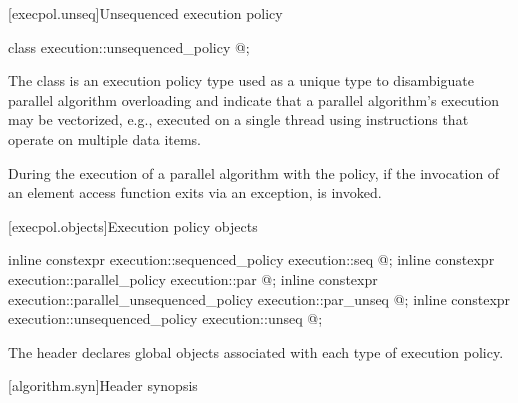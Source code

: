 [execpol.unseq]{Unsequenced execution policy}

%
\begin{itemdecl}
class execution::unsequenced_policy { @\unspec@ };
\end{itemdecl}

\begin{itemdescr}
\pnum
The class  is an execution policy type
used as a unique type to disambiguate parallel algorithm overloading and
indicate that a parallel algorithm's execution may be vectorized,
e.g., executed on a single thread using instructions
that operate on multiple data items.

\pnum
During the execution of a parallel algorithm with
the  policy,
if the invocation of an element access function exits via an exception,
 is invoked.
\end{itemdescr}

[execpol.objects]{Execution policy objects}

%
%
%
%
%
%
\begin{itemdecl}
inline constexpr execution::sequenced_policy            execution::seq{ @\unspec@ };
inline constexpr execution::parallel_policy             execution::par{ @\unspec@ };
inline constexpr execution::parallel_unsequenced_policy execution::par_unseq{ @\unspec@ };
inline constexpr execution::unsequenced_policy          execution::unseq{ @\unspec@ };
\end{itemdecl}

\begin{itemdescr}
\pnum
The header  declares global objects associated with each type of execution policy.
\end{itemdescr}

[algorithm.syn]{Header  synopsis}
%

